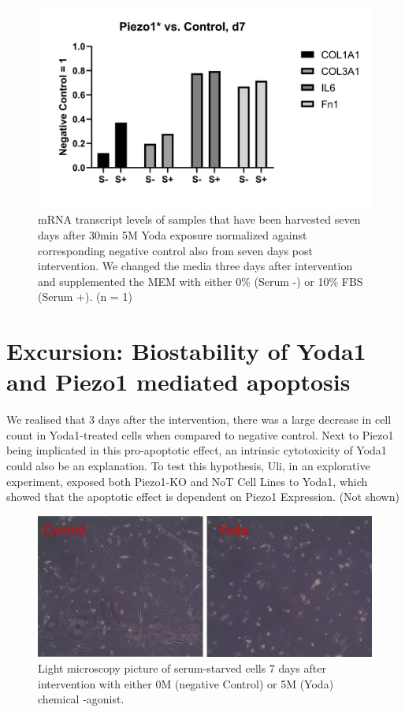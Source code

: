 \begin{figure}
\centering
\includegraphics[width = \linewidth{}]{LongTerm_PCR.png}
\caption{mRNA transcript levels of samples that have been harvested seven days after 30min 5\textmu{}M Yoda exposure normalized against corresponding negative control also from seven days post intervention. We changed the media three days after \Yoda intervention and supplemented the MEM\textalpha{} with either 0\% (Serum -) or 10\% FBS (Serum +). (n = 1)}
\label{fig:LongTerm_PCR}
\end{figure}

\section{Excursion: Biostability of Yoda1 and Piezo1 mediated apoptosis}
\label{sec:biostability}
We realised that 3 days after the intervention, there was a large decrease in cell count in Yoda1-treated cells when compared to negative control. Next to Piezo1 being implicated in this pro-apoptotic effect, an intrinsic cytotoxicity of Yoda1 could also be an explanation. To test this hypothesis, Uli, in an explorative experiment, exposed both Piezo1-KO and NoT Cell Lines to Yoda1, which showed that the apoptotic effect is dependent on Piezo1 Expression. (Not shown)

\begin{figure}
\centering
\includegraphics[width = \linewidth]{Yoda_Apoptosis.png}
\caption{Light microscopy picture of serum-starved cells 7 days after intervention with either 0\textmu{}M (negative Control) or 5\textmu{}M (Yoda) chemical \Piezo{}-agonist.}
\label{pic:Yoda_Apop}
\end{figure}